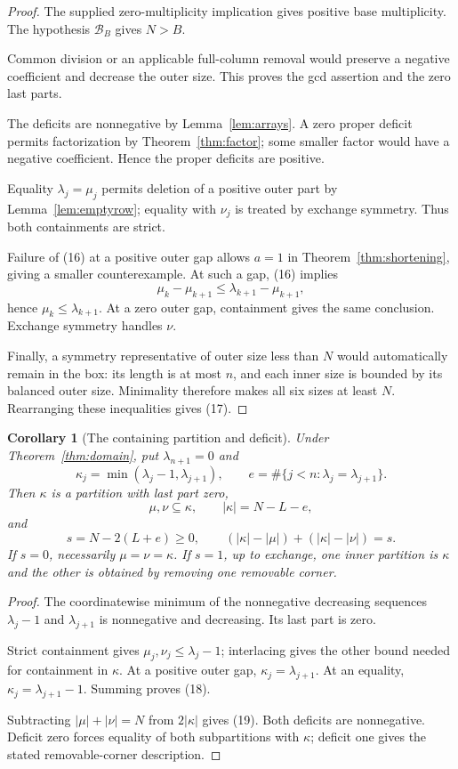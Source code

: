 \documentclass[11pt]{article}
\newtheorem{corollary}[theorem]{Corollary}
\begin{document}
\begin{proof}
The supplied zero-multiplicity implication gives positive base multiplicity. The hypothesis \(\mathcal B_B\) gives \(N>B\).

Common division or an applicable full-column removal would preserve a negative coefficient and decrease the outer size. This proves the gcd assertion and the zero last parts.

The deficits are nonnegative by Lemma~\ref{lem:arrays}. A zero proper deficit permits factorization by Theorem~\ref{thm:factor}; some smaller factor would have a negative coefficient. Hence the proper deficits are positive.

Equality \(\lambda_j=\mu_j\) permits deletion of a positive outer part by Lemma~\ref{lem:emptyrow}; equality with \(\nu_j\) is treated by exchange symmetry. Thus both containments are strict.

Failure of (16) at a positive outer gap allows \(a=1\) in Theorem~\ref{thm:shortening}, giving a smaller counterexample. At such a gap, (16) implies
\[
\mu_k-\mu_{k+1}\le\lambda_{k+1}-\mu_{k+1},
\]
hence \(\mu_k\le\lambda_{k+1}\). At a zero outer gap, containment gives the same conclusion. Exchange symmetry handles \(\nu\).

Finally, a symmetry representative of outer size less than \(N\) would automatically remain in the box: its length is at most \(n\), and each inner size is bounded by its balanced outer size. Minimality therefore makes all six sizes at least \(N\). Rearranging these inequalities gives (17).
\end{proof}

\begin{corollary}[The containing partition and deficit]\label{cor:kappa}
Under Theorem~\ref{thm:domain}, put \(\lambda_{n+1}=0\) and
\[
\kappa_j=\min(\lambda_j-1,\lambda_{j+1}),\qquad
e=\#\{j<n:\lambda_j=\lambda_{j+1}\}.
\]
Then \(\kappa\) is a partition with last part zero,
\[
\mu,\nu\subseteq\kappa,\qquad |\kappa|=N-L-e,
                                                               \tag{18}
\]
and
\[
s=N-2(L+e)\ge0,\qquad
(|\kappa|-|\mu|)+(|\kappa|-|\nu|)=s.
                                                               \tag{19}
\]
If \(s=0\), necessarily \(\mu=\nu=\kappa\). If \(s=1\), up to exchange, one inner partition is \(\kappa\) and the other is obtained by removing one removable corner.
\end{corollary}

\begin{proof}
The coordinatewise minimum of the nonnegative decreasing sequences \(\lambda_j-1\) and \(\lambda_{j+1}\) is nonnegative and decreasing. Its last part is zero.

Strict containment gives \(\mu_j,\nu_j\le\lambda_j-1\); interlacing gives the other bound needed for containment in \(\kappa\). At a positive outer gap, \(\kappa_j=\lambda_{j+1}\). At an equality, \(\kappa_j=\lambda_{j+1}-1\). Summing proves (18).

Subtracting \(|\mu|+|\nu|=N\) from \(2|\kappa|\) gives (19). Both deficits are nonnegative. Deficit zero forces equality of both subpartitions with \(\kappa\); deficit one gives the stated removable-corner description.
\end{proof}
\end{document}
